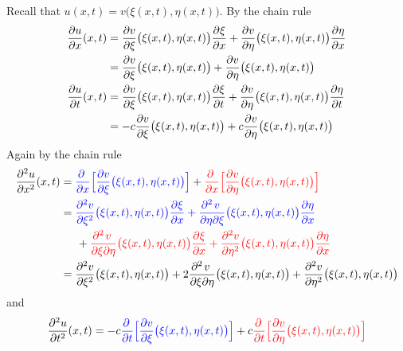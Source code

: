 \begin{solution}
Recall that $u(x,t)=v\big(\xi(x,t),\eta(x,t)\big)$.
By the chain rule
\begin{align*}
\pdiff{u}{x}(x,t)
&= \pdiff{v}{\xi}\big(\xi(x,t),\eta(x,t)\big)
   \pdiff{\xi}{x}
+\pdiff{v}{\eta}\big(\xi(x,t),\eta(x,t)\big)
   \pdiff{\eta}{x} \\
&= \pdiff{v}{\xi}\big(\xi(x,t),\eta(x,t)\big)
+\pdiff{v}{\eta}\big(\xi(x,t),\eta(x,t)\big)
\\
\pdiff{u}{t}(x,t)
&= \pdiff{v}{\xi}\big(\xi(x,t),\eta(x,t)\big)
   \pdiff{\xi}{t}
+\pdiff{v}{\eta}\big(\xi(x,t),\eta(x,t)\big)
   \pdiff{\eta}{t} \\
&= -c\pdiff{v}{\xi}\big(\xi(x,t),\eta(x,t)\big)
+c\pdiff{v}{\eta}\big(\xi(x,t),\eta(x,t)\big)
\end{align*}
Again by the chain rule
\begin{align*}
\frac{\partial^2 u}{\partial x^2}(x,t)
&=\textcolor{blue}{
     \pdiff{}{x} \Big[\pdiff{v}{\xi}\big(\xi(x,t),\eta(x,t)\big)\Big]}
+\textcolor{red}{\pdiff{}{x}
       \Big[\pdiff{v}{\eta}\big(\xi(x,t),\eta(x,t)\big)\Big]}\cr
&=\textcolor{blue}{
     \frac{\partial^2 v}{\partial \xi^2}\big(\xi(x,t),\eta(x,t)\big)
                                                         \pdiff{\xi}{x}
  +\frac{\partial^2\hfil v\hfil\,}{\partial\eta\partial \xi}
                                        \big(\xi(x,t),\eta(x,t)\big)
                                        \pdiff{\eta}{x}}\\&\hskip0.2in
+\textcolor{red}{\frac{\partial^2\hfil v\hfil\,}{\partial\xi\partial \eta}
                                      \big(\xi(x,t),\eta(x,t)\big)
                                                     \pdiff{\xi}{x}
+\frac{\partial^2 v}{\partial \eta^2}\big(\xi(x,t),\eta(x,t)\big)
                                                    \pdiff{\eta}{x}}\\
&=\frac{\partial^2 v}{\partial \xi^2}\big(\xi(x,t),\eta(x,t)\big)
+2\frac{\partial^2\hfil v\hfil\,}{\partial\xi\partial \eta}
                                       \big(\xi(x,t),\eta(x,t)\big)
+\frac{\partial^2 v}{\partial \eta^2}\big(\xi(x,t),\eta(x,t)\big)
\end{align*}
and
\begin{align*}
\frac{\partial^2 u}{\partial t^2}(x,t)
&=-c \textcolor{blue}{\pdiff{}{t}
              \Big[\pdiff{v}{\xi}\big(\xi(x,t),\eta(x,t)\big)\Big]}
+c\textcolor{red}{\pdiff{}{t}
              \Big[ \frac{\partial  v}{\partial\eta}
                          \big(\xi(x,t),\eta(x,t)\big)\Big]}
\\

\end{align*}
\end{solution}
